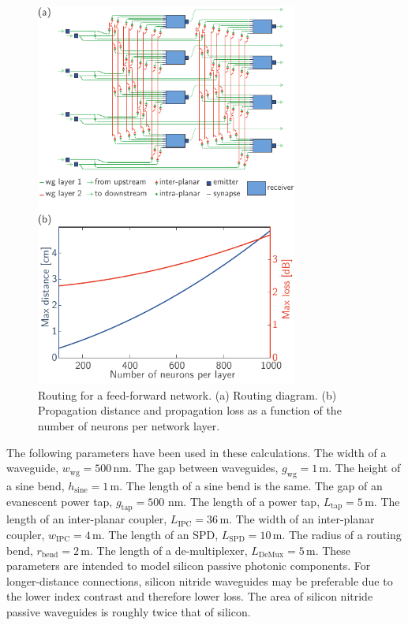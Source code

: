 \documentclass[aip,amsmath,amssymb,reprint,nofootinbib]{revtex4-1}
\begin{document}
\begin{figure}[t!]
	\centerline{\includegraphics[width=8.6cm]{_networks_feedForward_small.pdf}}
	\caption{\label{fig:networks_feedForward}Routing for a feed-forward network. (a) Routing diagram. (b) Propagation distance and propagation loss as a function of the number of neurons per network layer.}
\end{figure}
The following parameters have been used in these calculations. The width of a waveguide, $w_{\mathrm{wg}} = 500$\,nm. The gap between waveguides, $g_{\mathrm{wg}} = 1$\,\textmu m. The height of a sine bend, $h_{\mathrm{sine}} = 1$\,\textmu m. The length of a sine bend is the same. The gap of an evanescent power tap, $g_{\mathrm{tap}}= 500$ nm. The length of a power tap, $L_{\mathrm{tap}} = 5$\,\textmu m. The length of an inter-planar coupler, $L_{\mathrm{IPC}} = 36$\,\textmu m. The width of an inter-planar coupler, $w_{\mathrm{IPC}} = 4$\,\textmu m. The length of an SPD, $L_{\mathrm{SPD}} = 10$\,\textmu m. The radius of a routing bend, $r_{\mathrm{bend}} = 2$\,\textmu m. The length of a de-multiplexer, $L_{\mathrm{DeMux}} = 5$\,\textmu m.
These parameters are intended to model silicon passive photonic components. For longer-distance connections, silicon nitride waveguides may be preferable due to the lower index contrast and therefore lower loss. The area of silicon nitride passive waveguides is roughly twice that of silicon.  
\end{document}
